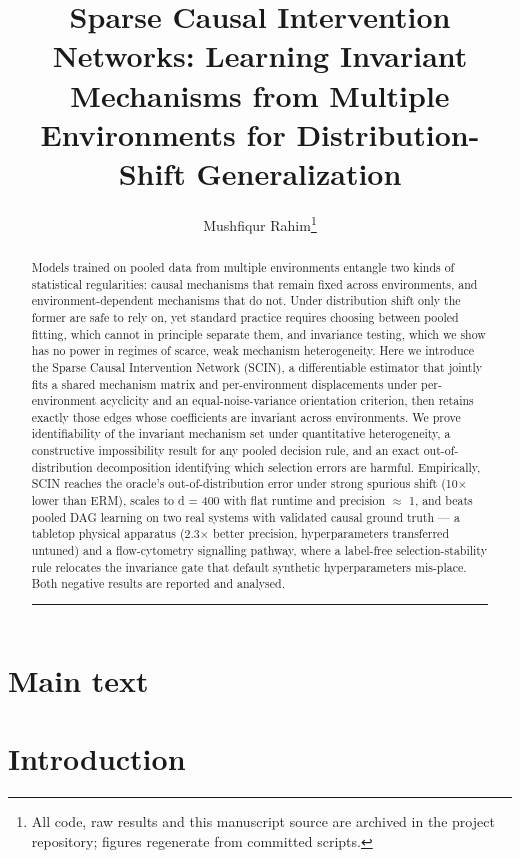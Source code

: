 \documentclass[11pt]{article}
\title{Sparse Causal Intervention Networks: Learning Invariant Mechanisms from Multiple Environments for Distribution-Shift Generalization}
\author{Mushfiqur Rahim\thanks{
All code, raw results and this manuscript source are archived in the
project repository; figures regenerate from committed scripts.}}
\date{}
\begin{document}
\maketitle

\begin{abstract}
Models trained on pooled data from multiple environments entangle two
kinds of statistical regularities: causal mechanisms that remain fixed
across environments, and environment-dependent mechanisms that do not.
Under distribution shift only the former are safe to rely on, yet
standard practice requires choosing between pooled fitting, which
cannot in principle separate them, and invariance testing, which we
show has no power in regimes of scarce, weak mechanism heterogeneity.
Here we introduce the Sparse Causal Intervention Network (SCIN), a
differentiable estimator that jointly fits a shared mechanism matrix
and per-environment displacements under per-environment acyclicity and
an equal-noise-variance orientation criterion, then retains exactly
those edges whose coefficients are invariant across environments. We
prove identifiability of the invariant mechanism set under quantitative
heterogeneity, a constructive impossibility result for any pooled
decision rule, and an exact out-of-distribution decomposition
identifying which selection errors are harmful. Empirically, SCIN
reaches the oracle's out-of-distribution error under strong spurious
shift (10\(\times\) lower than ERM), scales to d = 400 with flat runtime and
precision \(\approx\) 1, and beats pooled DAG learning on two real systems with
validated causal ground truth --- a tabletop physical apparatus (2.3\(\times\)
better precision, hyperparameters transferred untuned) and a
flow-cytometry signalling pathway, where a label-free
selection-stability rule relocates the invariance gate that default
synthetic hyperparameters mis-place. Both negative results are
reported and analysed.

\begin{center}\rule{0.5\linewidth}{0.5pt}\end{center}


\end{abstract}

\section*{Main text}
\section{Introduction }
\end{document}

